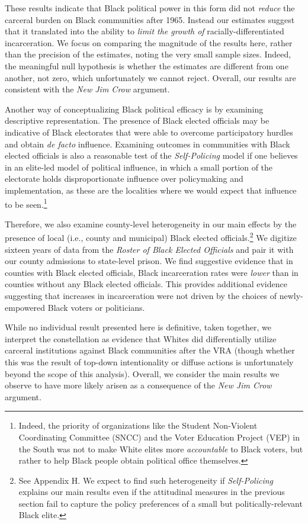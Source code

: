\documentclass[12pt]{article}
\begin{document}
These results indicate that Black political power in this form did not \emph{reduce} the carceral burden on Black communities after 1965.  Instead our estimates suggest that it translated into the ability to \emph{limit the growth of} racially-differentiated incarceration.  We focus on comparing the magnitude of the results here, rather than the precision of the estimates, noting the very small sample sizes.  Indeed, the meaningful null hypothesis is whether the estimates are different from one another, not zero, which unfortunately we cannot reject.  Overall, our results are consistent with the \emph{New Jim Crow} argument.

Another way of conceptualizing Black political efficacy is by examining descriptive representation. The presence of Black elected officials may be indicative of Black electorates that were able to overcome participatory hurdles and obtain \emph{de facto} influence.  Examining outcomes in communities with Black elected officials is also a reasonable test of the \emph{Self-Policing} model if one believes in an elite-led model of political influence, in which a small portion of the electorate holds disproportionate influence over policymaking and implementation, as these are the localities where we would expect that influence to be seen.\footnote{Indeed, the priority of organizations like the Student Non-Violent Coordinating Committee (SNCC) and the Voter Education Project (VEP) in the South was not to make White elites more \emph{accountable} to Black voters, but rather to help Black people obtain political office themselves.}

Therefore, we also examine county-level heterogeneity in our main effects by the presence of local (i.e., county and municipal) Black elected officials.\footnote{See Appendix H.  We expect to find such heterogeneity if \emph{Self-Policing} explains our main results even if the attitudinal measures in the previous section fail to capture the policy preferences of a small but politically-relevant Black elite.}  We digitize sixteen years of data from the \emph{Roster of Black Elected Officials} and pair it with our county admissions to state-level prison.  We find suggestive evidence that in counties with Black elected officials, Black incarceration rates were \emph{lower} than in counties without any Black elected officials. This provides additional evidence suggesting that increases in incarceration were not driven by the choices of newly-empowered Black voters or politicians.

While no individual result presented here is definitive, taken together, we interpret the constellation as evidence that Whites did differentially utilize carceral institutions against Black communities after the VRA (though whether this was the result of top-down intentionality or diffuse actions is unfortunately beyond the scope of this analysis).  Overall, we consider the main results we observe to have more likely arisen as a consequence of the \emph{New Jim Crow} argument.
\end{document}
